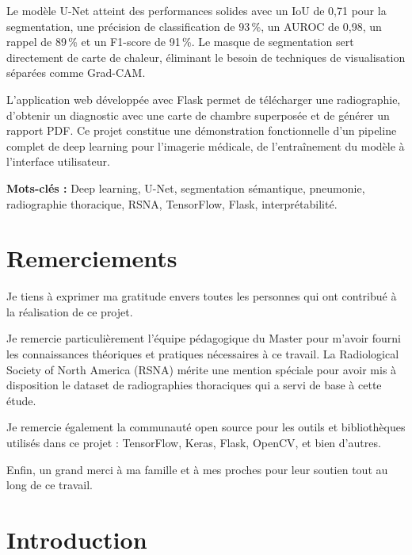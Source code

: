 \documentclass[12pt,a4paper,twoside]{report}
\begin{document}
Le modèle U-Net atteint des performances solides avec un IoU de 0,71 pour la segmentation, une précision de classification de 93\,\%, un AUROC de 0,98, un rappel de 89\,\% et un F1-score de 91\,\%. Le masque de segmentation sert directement de carte de chaleur, éliminant le besoin de techniques de visualisation séparées comme Grad-CAM.

L'application web développée avec Flask permet de télécharger une radiographie, d'obtenir un diagnostic avec une carte de chambre superposée et de générer un rapport PDF. Ce projet constitue une démonstration fonctionnelle d'un pipeline complet de deep learning pour l'imagerie médicale, de l'entraînement du modèle à l'interface utilisateur.

\vspace{0.5cm}
\textbf{Mots-clés :} Deep learning, U-Net, segmentation sémantique, pneumonie, radiographie thoracique, RSNA, TensorFlow, Flask, interprétabilité.

\chapter*{Remerciements}

Je tiens à exprimer ma gratitude envers toutes les personnes qui ont contribué à la réalisation de ce projet.

Je remercie particulièrement l'équipe pédagogique du Master pour m'avoir fourni les connaissances théoriques et pratiques nécessaires à ce travail. La Radiological Society of North America (RSNA) mérite une mention spéciale pour avoir mis à disposition le dataset de radiographies thoraciques qui a servi de base à cette étude.

Je remercie également la communauté open source pour les outils et bibliothèques utilisés dans ce projet : TensorFlow, Keras, Flask, OpenCV, et bien d'autres.

Enfin, un grand merci à ma famille et à mes proches pour leur soutien tout au long de ce travail.
\newpage
\tableofcontents
\newpage

\chapter{Introduction}
\end{document}
